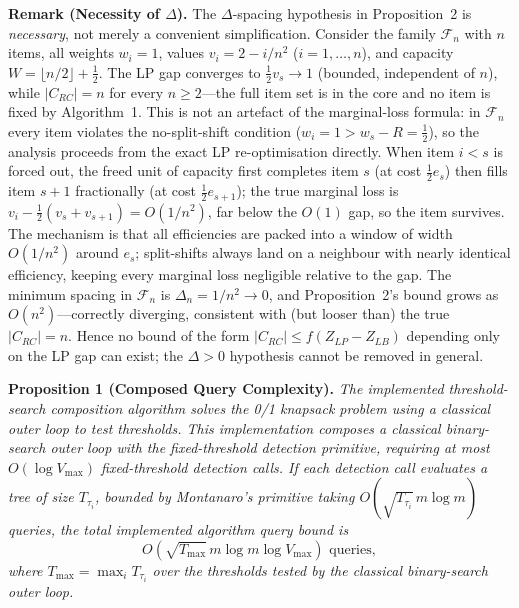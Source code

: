 \documentclass[conference]{IEEEtran} \IEEEoverridecommandlockouts
\begin{document}
\textbf{Remark (Necessity of $\Delta$).} The $\Delta$-spacing hypothesis in Proposition~2 is \emph{necessary}, not merely a convenient simplification. Consider the family $\mathcal{F}_n$ with $n$ items, all weights $w_i = 1$, values $v_i = 2 - i/n^2$ ($i = 1, \ldots, n$), and capacity $W = \lfloor n/2 \rfloor + \tfrac{1}{2}$. The LP gap converges to $\tfrac{1}{2}v_s \to 1$ (bounded, independent of $n$), while $|C_{RC}| = n$ for every $n \ge 2$---the full item set is in the core and no item is fixed by Algorithm~1. This is not an artefact of the marginal-loss formula: in $\mathcal{F}_n$ every item violates the no-split-shift condition ($w_i = 1 > w_s - R = \tfrac{1}{2}$), so the analysis proceeds from the exact LP re-optimisation directly. When item $i < s$ is forced out, the freed unit of capacity first completes item $s$ (at cost $\tfrac{1}{2}e_s$) then fills item $s{+}1$ fractionally (at cost $\tfrac{1}{2}e_{s+1}$); the true marginal loss is $v_i - \tfrac{1}{2}(v_s + v_{s+1}) = O(1/n^2)$, far below the $O(1)$ gap, so the item survives. The mechanism is that all efficiencies are packed into a window of width $O(1/n^2)$ around $e_s$; split-shifts always land on a neighbour with nearly identical efficiency, keeping every marginal loss negligible relative to the gap. The minimum spacing in $\mathcal{F}_n$ is $\Delta_n = 1/n^2 \to 0$, and Proposition~2's bound grows as $O(n^2)$---correctly diverging, consistent with (but looser than) the true $|C_{RC}| = n$. Hence no bound of the form $|C_{RC}| \le f(Z_{LP} - Z_{LB})$ depending only on the LP gap can exist; the $\Delta > 0$ hypothesis cannot be removed in general.

\textbf{Proposition 1 (Composed Query Complexity).} \textit{The implemented threshold-search composition algorithm solves the 0/1 knapsack problem using a classical outer loop to test thresholds. This implementation composes a classical binary-search outer loop with the fixed-threshold detection primitive, requiring at most $O(\log V_{\max})$ fixed-threshold detection calls. If each detection call evaluates a tree of size $T_{\tau_i}$, bounded by Montanaro's primitive taking $O(\sqrt{T_{\tau_i}}\,m\log m)$ queries, the total implemented algorithm query bound is}
\begin{equation}
    O\!\left(\sqrt{T_{\max}}\,m\log m\log V_{\max}\right) \text{ queries},
    \label{eq:totalcomplexity}
\end{equation}
\textit{where $T_{\max} = \max_i T_{\tau_i}$ over the thresholds tested by the classical binary-search outer loop.}
\end{document}
